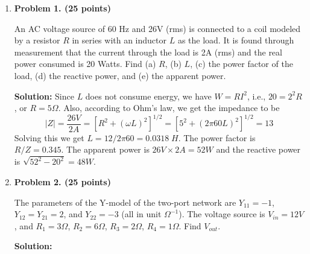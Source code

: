 \begin{enumerate}

\item {\bf Problem 1. (25 points)} 

An AC voltage source of 60 Hz and 26V (rms) is connected to a coil
modeled by a resistor $R$ in series with an inductor $L$ as the load. 
It is found through measurement that the current through the load is 
2A (rms) and the real power consumed is 20 Watts. Find (a) $R$, (b) $L$,
(c) the power factor of the load, (d) the reactive power, and (e) the 
apparent power.

 {\bf Solution:} Since $L$ does not consume energy, we have $W=RI^2$,
 i.e., $20=2^2 R$, or $R=5\Omega$. Also, according to Ohm's law, we get
 the impedance to be
 \[ |Z|=\frac{26V}{2A}=[R^2+(\omega L)^2]^{1/2}=[5^2+(2\pi 60 L)^2]^{1/2}=13 \]
 Solving this we get $L=12/2\pi 60=0.0318\;H$. The power factor is
 $R/Z=0.345$. The apparent power is $26V \times 2A=52W$
 and the reactive power is $\sqrt{52^2-20^2}=48W$.

\item {\bf Problem 2. (25 points)} 

The parameters of the Y-model of the two-port network are $Y_{11}=-1$,
$Y_{12}=Y_{21}=2$, and $Y_{22}=-3$ (all in unit $\Omega^{-1}$). The 
voltage source is $V_{in}=12V$, and $R_1=3\Omega$, $R_2=6\Omega$, 
$R_3=2\Omega$, $R_4=1\Omega$. Find $V_{out}$.


 {\bf Solution:}
 
 \begin{itemize}
 

\end{itemize}
\end{enumerate}
